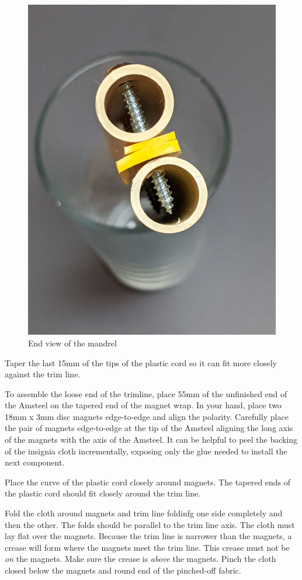 \documentclass[
]{book}
\begin{document}
\begin{figure}

{\centering \includegraphics[width=0.7\linewidth]{images/plastic_cord_mandrel_end_view} 

}

\caption{End view of the mandrel}\label{fig:plastic-cord-mandrel-end-view}
\end{figure}

Taper the last 15mm of the tips of the plastic cord so it can fit more closely against the trim line.

To assemble the loose end of the trimline, place 55mm of the unfinished end of the Amsteel on the tapered end of the magnet wrap. In your hand, place two 18mm x 3mm disc magnets edge-to-edge and align the polarity. Carefully place the pair of magnets edge-to-edge at the tip of the Amsteel aligning the long axis of the magnets with the axis of the Amsteel. It can be helpful to peel the backing of the insignia cloth incrementally, exposing only the glue needed to install the next component.

Place the curve of the plastic cord closely around magnets. The tapered ends of the plastic cord should fit closely around the trim line.

Fold the cloth around magnets and trim line foldinfg one side completely and then the other. The folds should be parallel to the trim line axis. The cloth must lay flat over the magnets. Because the trim line is narrower than the magnets, a crease will form where the magnets meet the trim line. This crease must not be \emph{on} the magnets. Make sure the crease is \emph{above} the magnets. Pinch the cloth closed below the magnets and round end of the pinched-off fabric.
\end{document}
